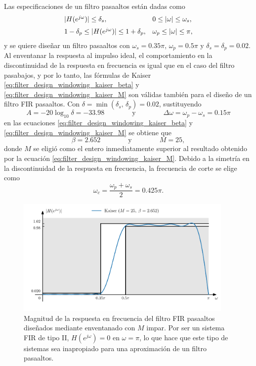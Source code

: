 \documentclass[a4paper]{report}
\begin{document}
Las especificaciones de un filtro pasaaltos están dadas como
\[
 \begin{array}{ll}
  |H(e^{j\omega})|\leq\delta_s, & 0\leq|\omega|\leq\omega_s,\\[\medskipamount]
  1-\delta_p\leq|H(e^{j\omega})|\leq1+\delta_p, & \omega_p\leq|\omega|\leq\pi,
 \end{array} 
\]
y se quiere diseñar un filtro pasaaltos con \(\omega_s=0.35\pi\), \(\omega_p=0.5\pi\) y \(\delta_s=\delta_p=0.02\). Al enventanar la respuesta al impulso ideal, el comportamiento en la discontinuidad de la respuesta en frecuencia es igual que en el caso del filtro pasabajos, y por lo tanto, las fórmulas de Kaiser \ref{eq:filter_design_windowing_kaiser_beta} y \ref{eq:filter_design_windowing_kaiser_M}  son válidas también para el diseño de un filtro FIR pasaaltos. Con \(\delta=\min(\delta_s,\,\delta_p)=0.02\), sustituyendo
\[
 A=-20\log_{10}\delta=-33.98
 \qquad\qquad\textrm{y}\qquad\qquad
 \Delta\omega=\omega_p-\omega_s=0.15\pi
\] 
en las ecuaciones \ref{eq:filter_design_windowing_kaiser_beta} y \ref{eq:filter_design_windowing_kaiser_M} se obtiene que
\[
 \beta = 2.652
 \qquad\qquad\textrm{y}\qquad\qquad
 M = 25,
\]
donde \(M\) se eligió como el entero inmediatamente superior al resultado obtenido por la ecuación \ref{eq:filter_design_windowing_kaiser_M}. Debido a la simetría en la discontinuidad de la respuesta en frecuencia, la frecuencia de corte se elige como
\[
 \omega_c=\frac{\omega_p+\omega_s}{2}=0.425\pi.
\]
\begin{figure}[!htb]
 \begin{center}
 \includegraphics[width=0.94\textwidth]{figuras/filter_design_windowing_kaiser_high_pass_freq_response_M_odd.pdf}
 \caption{\label{fig:filter_design_windowing_kaiser_high_pass_freq_response_M_odd} Magnitud de la respuesta en frecuencia del filtro FIR pasaaltos diseñados mediante enventanado con \(M\) impar. Por ser un sistema FIR de tipo II, \(H(e^{j\omega})=0\) en \(\omega=\pi\), lo que hace que este tipo de sistemas sea inapropiado para una aproximación de un filtro pasaaltos.}
 \end{center}
\end{figure}
\end{document}
